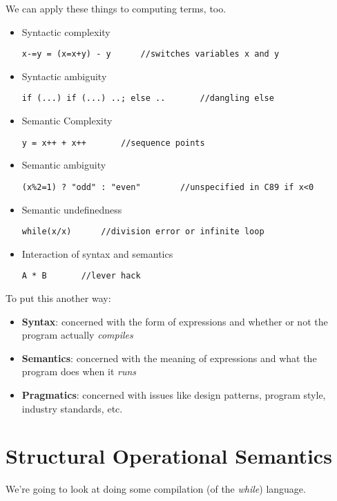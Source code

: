 \documentclass[11pt,a4paper,titlepage,dvipsnames,cmyk]{scrartcl}
\begin{document}
We can apply these things to computing terms, too.
\begin{itemize}
    \item Syntactic complexity
            \begin{lstlisting}
x-=y = (x=x+y) - y      //switches variables x and y
            \end{lstlisting}
    \item Syntactic ambiguity
\begin{lstlisting}
if (...) if (...) ..; else ..       //dangling else
\end{lstlisting}
        \item Semantic Complexity
\begin{lstlisting}
y = x++ + x++       //sequence points
\end{lstlisting}
        \item Semantic ambiguity
\begin{lstlisting}
(x%2=1) ? "odd" : "even"        //unspecified in C89 if x<0
\end{lstlisting}
            \item Semantic undefinedness
\begin{lstlisting}
while(x/x)      //division error or infinite loop
\end{lstlisting}
            \item Interaction of syntax and semantics
\begin{lstlisting}
A * B       //lever hack
\end{lstlisting}

\end{itemize}

To put this another way:
\begin{itemize}
    \item \textbf{Syntax}: concerned with the form of expressions and
        whether or not the program actually \textit{compiles}
    \item \textbf{Semantics}: concerned with the meaning of expressions
        and what the program does when it \textit{runs}
    \item \textbf{Pragmatics}: concerned with issues like design patterns,
        program style, industry standards, etc.
\end{itemize}

\section{Structural Operational Semantics}%
\label{sec:struct-op-semantics}
We're going to look at doing some compilation (of the \textit{while})
language.
\end{document}

